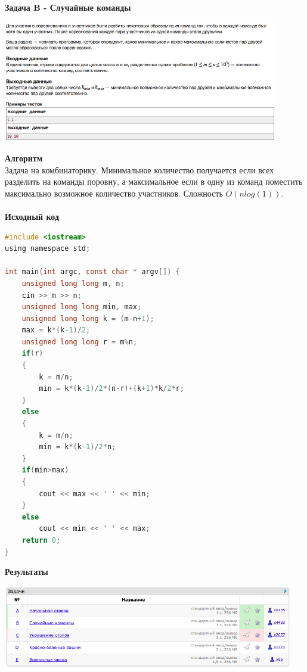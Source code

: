 \documentclass[a4paper,12pt]{article}
\begin{document}
\newpage
\textbf{{\large Задача B - Случайные команды}} \\
\begin{center}
\includegraphics[width=0.9\textwidth]{C_273/C_273_B.png}\\ [1cm]
\end{center}
\textbf{{\large Алгоритм}} \\
Задача на комбинаторику. Минимальное количество получается если всех разделить на команды поровну, а максимальное если в одну из команд поместить максимально возможное количество участников. Сложность $O(nlog(1))$.\\ 
\\
\textbf{{\large Исходный код}}
\begin{lstlisting}[language=C]
#include <iostream>
using namespace std;

int main(int argc, const char * argv[]) {
    unsigned long long m, n;
    cin >> m >> n;
    unsigned long long min, max;
    unsigned long long k = (m-n+1);
    max = k*(k-1)/2;
    unsigned long long r = m%n;
    if(r)
    {
        k = m/n;
        min = k*(k-1)/2*(n-r)+(k+1)*k/2*r;
    }
    else
    {
        k = m/n;
        min = k*(k-1)/2*n;
    }
    if(min>max)
    {
        cout << max << ' ' << min;
    }
    else
        cout << min << ' ' << max;
    return 0;
}
\end{lstlisting}

\textbf{{\large Результаты}} \\
\begin{center}
\includegraphics[width=0.95\textwidth]{C_273/A_C_273_result.png}\\ [1cm]
\end{center}
\end{document}
